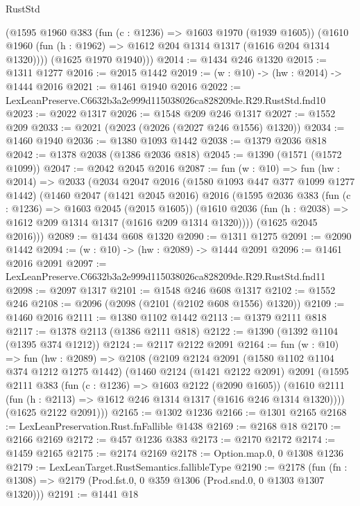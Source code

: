 \begin{lexlean}{RustStd}
\begin{coremodule}
        (@1595
          @1960
          @383
          (fun (c : @1236) => @1603 @1970 (@1939 @1605))
          (@1610 @1960 (fun (h : @1962) => @1612 @204 @1314 @1317 (@1616 @204 @1314 @1320))))
        (@1625 @1970 @1940)))
@2014 := @1434 @246 @1320
@2015 := @1311 @1277
@2016 := @2015 @1442
@2019 := (w : @10) -> (hw : @2014) -> @1444 @2016
@2021 := @1461 @1940 @2016
@2022 := LexLeanPreserve.C6632b3a2e999d115038026ca828209de.R29.RustStd.fnd10
@2023 := @2022 @1317
@2026 := @1548 @209 @246 @1317
@2027 := @1552 @209
@2033 := @2021 (@2023 (@2026 (@2027 @246 @1556) @1320))
@2034 := @1460 @1940
@2036 := @1380 @1093 @1442
@2038 := @1379 @2036 @818
@2042 := @1378 @2038 (@1386 @2036 @818)
@2045 := @1390 (@1571 (@1572 @1099))
@2047 := @2042 @2045 @2016
@2087 := fun (w : @10) =>
  fun (hw : @2014) =>
  @2033
    (@2034
      @2047
      @2016
      (@1580 @1093 @447 @377 @1099 @1277 @1442)
      (@1460
        @2047
        (@1421 @2045 @2016)
        @2016
        (@1595
          @2036
          @383
          (fun (c : @1236) => @1603 @2045 (@2015 @1605))
          (@1610 @2036 (fun (h : @2038) => @1612 @209 @1314 @1317 (@1616 @209 @1314 @1320))))
        (@1625 @2045 @2016)))
@2089 := @1434 @608 @1320
@2090 := @1311 @1275
@2091 := @2090 @1442
@2094 := (w : @10) -> (hw : @2089) -> @1444 @2091
@2096 := @1461 @2016 @2091
@2097 := LexLeanPreserve.C6632b3a2e999d115038026ca828209de.R29.RustStd.fnd11
@2098 := @2097 @1317
@2101 := @1548 @246 @608 @1317
@2102 := @1552 @246
@2108 := @2096 (@2098 (@2101 (@2102 @608 @1556) @1320))
@2109 := @1460 @2016
@2111 := @1380 @1102 @1442
@2113 := @1379 @2111 @818
@2117 := @1378 @2113 (@1386 @2111 @818)
@2122 := @1390 (@1392 @1104 (@1395 @374 @1212))
@2124 := @2117 @2122 @2091
@2164 := fun (w : @10) =>
  fun (hw : @2089) =>
  @2108
    (@2109
      @2124
      @2091
      (@1580 @1102 @1104 @374 @1212 @1275 @1442)
      (@1460
        @2124
        (@1421 @2122 @2091)
        @2091
        (@1595
          @2111
          @383
          (fun (c : @1236) => @1603 @2122 (@2090 @1605))
          (@1610 @2111 (fun (h : @2113) => @1612 @246 @1314 @1317 (@1616 @246 @1314 @1320))))
        (@1625 @2122 @2091)))
@2165 := @1302 @1236
@2166 := @1301 @2165
@2168 := LexLeanPreservation.Rust.fnFallible @1438
@2169 := @2168 @18
@2170 := @2166 @2169
@2172 := @457 @1236 @383
@2173 := @2170 @2172
@2174 := @1459 @2165
@2175 := @2174 @2169
@2178 := Option.map.{0, 0} @1308 @1236
@2179 := LexLeanTarget.RustSemantics.fallibleType
@2190 := @2178
    (fun (fn : @1308) => @2179 (Prod.fst.{0, 0} @359 @1306 (Prod.snd.{0, 0} @1303 @1307 @1320)))
@2191 := @1441 @18

\end{coremodule}
\end{lexlean}
